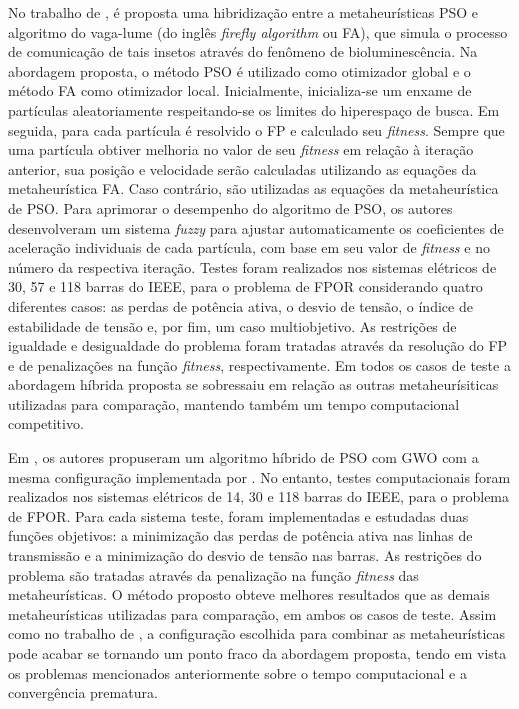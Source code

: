 \documentclass[
	12pt,				%
	openany,			%
	twoside,			%
	a4paper,			%
	chapter=TITLE,		%
	section=Title,		%
	subsection=Title,	%
	subsubsection=Title,%
	english,			%
	french,				%
	spanish,			%
	brazil			%
	]{abntex2}
\begin{document}
\begin{ERRATA}
No trabalho de , é proposta uma hibridização entre a metaheurísticas PSO e algoritmo do vaga-lume (do inglês \emph{firefly algorithm} ou FA), que simula o processo de comunicação de tais insetos através do fenômeno de bioluminescência. Na abordagem proposta, o método PSO é utilizado como otimizador global e o método FA como otimizador local. Inicialmente, inicializa-se um enxame de partículas aleatoriamente respeitando-se os limites do hiperespaço de busca. Em seguida, para cada partícula é resolvido o FP e calculado seu \emph{fitness}. Sempre que uma partícula obtiver melhoria no valor de seu \emph{fitness} em relação à iteração anterior, sua posição e velocidade serão calculadas utilizando as equações da metaheurística FA. Caso contrário, são utilizadas as equações da metaheurística de PSO. Para aprimorar o desempenho do algoritmo de PSO, os autores desenvolveram um sistema \emph{fuzzy} para ajustar automaticamente os coeficientes de aceleração individuais de cada partícula, com base em seu valor de \emph{fitness} e no número da respectiva iteração. Testes foram realizados nos sistemas elétricos de 30, 57 e 118 barras do IEEE, para o problema de FPOR considerando quatro diferentes casos: as perdas de potência ativa, o desvio de tensão, o índice de estabilidade de tensão e, por fim, um caso multiobjetivo. As restrições de igualdade e desigualdade do problema foram tratadas através da resolução do FP e de penalizações na função \emph{fitness}, respectivamente. Em todos os casos de teste a abordagem híbrida proposta se sobressaiu em relação as outras metaheurísiticas utilizadas para comparação, mantendo também um tempo computacional competitivo.


Em , os autores propuseram um algoritmo híbrido de PSO com GWO com a mesma configuração implementada por . No entanto, testes computacionais foram realizados nos sistemas elétricos de 14, 30 e 118 barras do IEEE, para o problema de FPOR. Para cada sistema teste, foram implementadas e estudadas duas funções objetivos: a minimização das perdas de potência ativa nas linhas de transmissão e a minimização do desvio de tensão nas barras. As restrições do problema são tratadas através da penalização na função \emph{fitness} das metaheurísticas. O método proposto obteve melhores resultados que as demais metaheurísticas utilizadas para comparação, em ambos os casos de teste. Assim como no trabalho de , a configuração escolhida para combinar as metaheurísticas pode acabar se tornando um ponto fraco da abordagem proposta, tendo em vista os problemas mencionados anteriormente sobre o tempo computacional e a convergência prematura.



\end{ERRATA}
\end{document}
